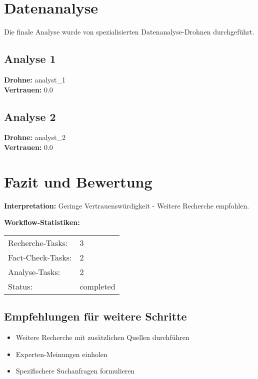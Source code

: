 \documentclass[12pt,a4paper]{article}
\begin{document}
\newpage
\section{Datenanalyse}

Die finale Analyse wurde von spezialisierten Datenanalyse-Drohnen durchgeführt.

\subsection{Analyse 1}

\textbf{Drohne:} analyst\_1\\
\textbf{Vertrauen:} 0.0%

\subsection{Analyse 2}

\textbf{Drohne:} analyst\_2\\
\textbf{Vertrauen:} 0.0%


\newpage
\section{Fazit und Bewertung}


\textbf{Interpretation:} Geringe Vertrauenswürdigkeit - Weitere Recherche empfohlen.

\textbf{Workflow-Statistiken:}
\begin{tabular}{ll}
Recherche-Tasks: & 3 \\
Fact-Check-Tasks: & 2 \\
Analyse-Tasks: & 2 \\
Status: & completed \\
\end{tabular}

\subsection{Empfehlungen für weitere Schritte}

\begin{itemize}
\item Weitere Recherche mit zusätzlichen Quellen durchführen
\item Experten-Meinungen einholen
\item Spezifischere Suchanfragen formulieren
\end{itemize}
\end{document}
